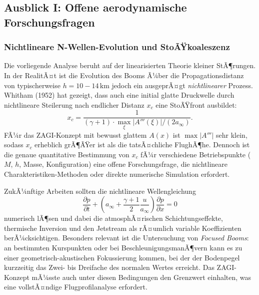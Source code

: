 ﻿\documentclass[12pt,a4paper]{article}
\theoremstyle{definition}
\theoremstyle{remark}
\newcommand{\pdd}[2]{\frac{\partial #1}{\partial #2}}
\begin{document}
\subsection{Ausblick I: Offene aerodynamische Forschungsfragen}
\label{sec:ausblick_aero}

\subsubsection{Nichtlineare N-Wellen-Evolution und StoÃŸkoaleszenz}

Die vorliegende Analyse beruht auf der linearisierten Theorie kleiner StÃ¶rungen. In der
RealitÃ¤t ist die Evolution des Booms Ã¼ber die Propagationsdistanz von typischerweise
$h = 10{-}14\,\text{km}$ jedoch ein ausgeprÃ¤gt \emph{nichtlinearer} Prozess. Whitham (1952)
hat gezeigt, dass auch eine initial glatte Druckwelle durch nichtlineare Steilerung nach
endlicher Distanz $x_c$ eine StoÃŸfront ausbildet:
\begin{equation}
  x_c = \frac{1}{(\gamma + 1) \cdot \max_\xi |A'''(\xi)| / (2 a_\infty)}.
  \label{eq:steilungslaenge}
\end{equation}
FÃ¼r das ZAGI-Konzept mit bewusst glattem $A(x)$ ist $\max|A'''|$ sehr klein, sodass $x_c$
erheblich grÃ¶ÃŸer ist als die tatsÃ¤chliche FlughÃ¶he. Dennoch ist die genaue quantitative
Bestimmung von $x_c$ fÃ¼r verschiedene Betriebspunkte ($M$, $h$, Masse, Konfiguration) eine
offene Forschungsfrage, die nichtlineare Charakteristiken-Methoden oder direkte numerische
Simulation erfordert.

ZukÃ¼nftige Arbeiten sollten die nichtlineare Wellengleichung
\begin{equation}
  \pdd{p}{t} + \left(a_\infty + \frac{\gamma+1}{2}\frac{u}{a_\infty}\right) \pdd{p}{x} = 0
  \label{eq:nichtlinear_welle}
\end{equation}
numerisch lÃ¶sen und dabei die atmosphÃ¤rischen Schichtungseffekte, thermische Inversion
und den Jetstream als rÃ¤umlich variable Koeffizienten berÃ¼cksichtigen. Besonders relevant
ist die Untersuchung von \emph{Focused Booms}: an bestimmten Kurspunkten oder bei
BeschleunigungsmanÃ¶vern kann es zu einer geometrisch-akustischen Fokussierung kommen,
bei der der Bodenpegel kurzzeitig das Zwei- bis Dreifache des normalen Wertes erreicht.
Das ZAGI-Konzept mÃ¼sste auch unter diesen Bedingungen den Grenzwert einhalten, was
eine vollstÃ¤ndige Flugprofilanalyse erfordert.
\end{document}
